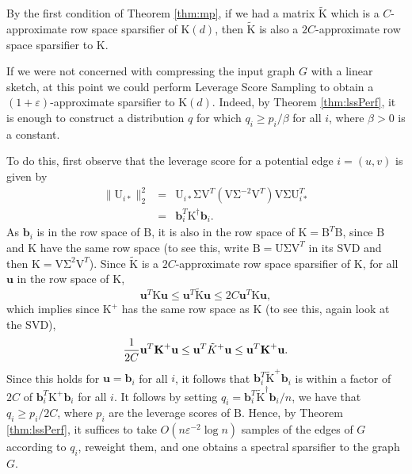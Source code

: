 \documentclass[11pt]{article}
\newcommand{\mat}[1]{{\ensuremath{\bm{\mathrm{#1}}}}}
\def\b{{\mathbf b}}
\def\u{{\mathbf u}}
\def\matB{\mat{B}}
\def\matK{\mat{K}}
\def\matU{\mat{U}}
\def\matV{\mat{V}}
\def\frac#1#2{{#1\over #2}}
\def\b{{\mathbf b}}
\newcommand{\eps}{\varepsilon}
\begin{document}
By the first condition of Theorem \ref{thm:mp}, if we had a matrix $\tilde{\matK}$ which is a $C$-approximate
row space sparsifier of $\matK(d)$, then $\tilde{\matK}$ is also a $2C$-approximate row space sparsifier to $\matK$. 

If we were not
concerned with compressing the input graph $G$ with a linear sketch, at this point we could perform
Leverage Score Sampling to obtain a $(1+\eps)$-approximate sparsifier to $\matK(d)$. Indeed, by 
Theorem \ref{thm:lssPerf}, it is enough to construct a distribution $q$
for which $q_i \geq p_i/\beta$ for all $i$, where $\beta > 0$ is a constant. 

To do this, first observe that the leverage score for a potential edge $i = (u,v)$ is given by
\begin{eqnarray}\label{eqn:newLabel}
\|\matU_{i*}\|_2^2 & = & \matU_{i*} \mat\Sigma \matV^T (\matV \mat\Sigma^{-2} \matV^T) \matV \mat\Sigma \matU_{i*}^T\\
& = & \b_i^T \matK^{\dagger} \b_i.
\end{eqnarray}
As $\b_i$ is in the row space of $\matB$, it is also in the row space of $\matK = \matB^T \matB$,
since $\matB$ and $\matK$ have the same row space (to see this, write $\matB = \matU \mat\Sigma \matV^T$
in its SVD and then $\matK = \matV \mat\Sigma^2 \matV^T$). Since $\tilde{\matK}$ is a 
$2C$-approximate row space sparsifier of $\matK$, for all $\u$ in the row space of $\matK$, 
$$\u^T \matK \u \leq \u^T \tilde{\matK} \u \leq 2C \u^T \matK \u,$$
which implies since $\matK^+$ has the same row space as $\matK$ (to see this, again look at the SVD), 
$$\frac{1}{2C} \u^T \matK^+ \u \leq \u^T \tilde{K}^+ \u \leq \u^T \matK^+ \u.$$
Since this holds for $\u = \b_i$ for all $i$, it follows that $\b_i^T \tilde{\matK}^+ \b_i$ is within a factor
of $2C$ of $\b_i^T \matK^+ \b_i$ for all $i$. It follows 
by setting $q_i = \b_i^T \tilde{\matK}^{\dagger} \b_i/n$, we have that $q_i \geq p_i/2C$, where $p_i$
are the leverage scores of $\matB$. Hence, by Theorem \ref{thm:lssPerf}, 
it suffices to take $O(n \eps^{-2} \log n)$ samples of the edges of $G$ according to $q_i$, reweight them,
and one obtains a spectral sparsifier to the graph $G$. 
\end{document}
